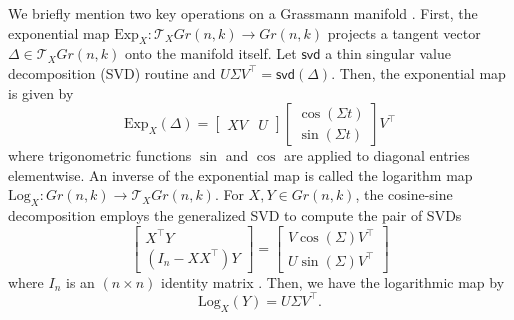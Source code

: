 \documentclass[11pt]{article}
\begin{document}
We briefly mention two key operations on a Grassmann manifold \citep{bendokat_grassmann_2020}. First, the exponential map $\text{Exp}_X:\mathcal{T}_X Gr(n,k) \rightarrow Gr(n,k)$ projects a tangent vector $\Delta \in \mathcal{T}_X Gr(n,k)$ onto the manifold itself. Let $\textsf{svd}$ a thin singular value decomposition (SVD) routine and $U\Sigma V^\top = \textsf{svd}(\Delta)$. Then, the exponential map is given by
	\begin{equation}\label{eq:grassmann_exp}
	\text{Exp}_X (\Delta) = \begin{bmatrix}
	XV & U
	\end{bmatrix}
	\begin{bmatrix}
	\cos (\Sigma t)\\
	\sin (\Sigma t)
	\end{bmatrix}
	V^\top
	\end{equation}
	where trigonometric functions $\sin$ and $\cos$ are applied to diagonal entries elementwise. An inverse of the exponential map is called the logarithm map $\text{Log}_X : Gr(n,k) \rightarrow \mathcal{T}_X Gr(n,k)$. For $X,Y \in Gr(n,k)$, the cosine-sine decomposition employs the generalized SVD to compute the pair of SVDs
	\begin{equation*}
	\begin{bmatrix}
	X^\top Y \\
	(I_n - XX^\top ) Y
	\end{bmatrix}
	= \begin{bmatrix}
	V \cos (\Sigma) V^\top\\
	U \sin(\Sigma) V^\top
	\end{bmatrix}
	\end{equation*}  
	where $I_n$ is an $(n\times n)$ identity matrix \citep{edelman_geometry_1998}. Then, we have the logarithmic map by
	\begin{equation}\label{eq:grassmann_log}
	\text{Log}_X (Y) = U\Sigma V^\top.
	\end{equation}
	
	
	
\end{document}

